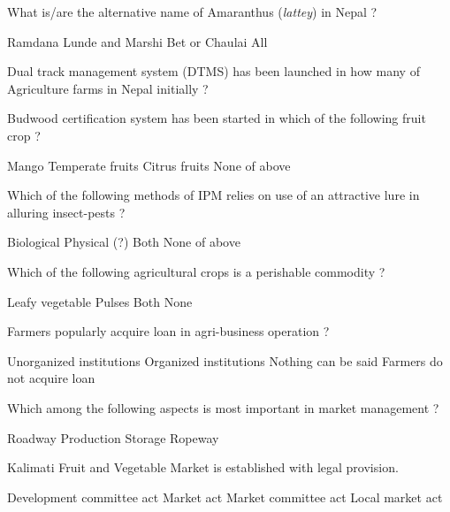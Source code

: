\begin{questions}
\question What is/are the alternative name of Amaranthus (\textit{lattey}) in Nepal ?
\begin{choices}
\choice Ramdana
\choice Lunde and Marshi
\choice Bet or Chaulai
\CorrectChoice All
\end{choices}

\question Dual track management system (DTMS) has been launched in how many of Agriculture farms in Nepal initially ?
\begin{choices}
\end{choices}

\question Budwood certification system has been started in which of the following fruit crop ?
\begin{choices}
\choice Mango
\choice Temperate fruits
\CorrectChoice Citrus fruits
\choice None of above
\end{choices}

\question Which of the following methods of IPM relies on use of an attractive lure in alluring insect-pests ?
\begin{choices}
\choice Biological
\CorrectChoice Physical (?)
\choice Both
\choice None of above
\end{choices}

\question Which of the following agricultural crops is a perishable commodity ?
\begin{choices}
\CorrectChoice Leafy vegetable
\choice Pulses
\choice Both
\choice None
\end{choices}

\question Farmers popularly acquire \fillin[][3cm] loan in agri-business operation ?
\begin{choices}
\CorrectChoice Unorganized institutions
\choice Organized institutions
\choice Nothing can be said
\choice Farmers do not acquire loan
\end{choices}

\question Which among the following aspects is most important in market management ?
\begin{choices}
\CorrectChoice Roadway
\choice Production
\choice Storage
\choice Ropeway
\end{choices}

\question Kalimati Fruit and Vegetable Market is established with \fillin[][3cm] legal provision.
\begin{choices}
\CorrectChoice Development committee act
\choice Market act
\choice Market committee act
\choice Local market act
\end{choices}


\end{questions}
